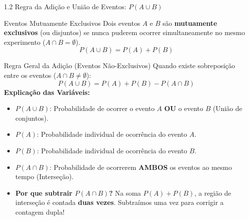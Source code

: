 \documentclass[10pt, aspectratio=169]{beamer}
\begin{document}
\begin{frame}{1.2 Regra da Adição e União de Eventos: $P(A \cup B)$}
    \begin{block}{Eventos Mutuamente Exclusivos}
        Dois eventos $A$ e $B$ são \textbf{mutuamente exclusivos} (ou disjuntos) se nunca puderem ocorrer simultaneamente no mesmo experimento ($A \cap B = \emptyset$). 
        \[ P(A \cup B) = P(A) + P(B) \]
    \end{block}
    \begin{alertblock}{Regra Geral da Adição (Eventos Não-Exclusivos)}
        Quando existe sobreposição entre os eventos ($A \cap B \neq \emptyset$):
        \vspace{-0.2cm}
        \[ P(A \cup B) = P(A) + P(B) - P(A \cap B) \]
        \textbf{Explicação das Variáveis:}
        \begin{itemize}
            \item $P(A \cup B)$: Probabilidade de ocorrer o evento $A$ \textbf{OU} o evento $B$ (União de conjuntos).
            \item $P(A)$: Probabilidade individual de ocorrência do evento $A$.
            \item $P(B)$: Probabilidade individual de ocorrência do evento $B$.
            \item $P(A \cap B)$: Probabilidade de ocorrerem \textbf{AMBOS} os eventos ao mesmo tempo (Interseção).
            \item \textbf{Por que subtrair $P(A \cap B)$?} Na soma $P(A) + P(B)$, a região de interseção é contada \textbf{duas vezes}. Subtraímos uma vez para corrigir a contagem dupla!
        \end{itemize}
    \end{alertblock}
\end{frame}
\end{document}
